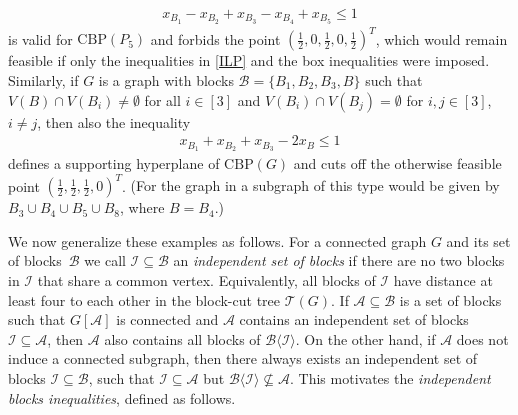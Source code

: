 \documentclass[12pt]{amsart}
\newcommand{\CBP}{\mathrm{CBP}}
\newcommand{\I}{\mathcal{I}}
\newcommand{\T}{\mathcal{T}}
\newcommand{\B}{\mathcal{B}}
\newcommand{\A}{\mathcal{A}}
\newcommand{\Xn}[1]{{\protect#1}}
\begin{document}
\begin{align*}
    x_{B_1}-x_{B_2}+x_{B_3}-x_{B_4}+x_{B_5} \le 1
\end{align*}
is valid for $\CBP(P_5)$ and forbids the point $(\frac{1}{2},0,\frac{1}{2},0,\frac{1}{2})^T$, which would remain feasible if only the inequalities in \eqref{ILP} and the box inequalities were imposed. Similarly, if $G$ is a graph with blocks $\B=\{B_1,B_2,B_3,B\}$ such that $V(B) \cap V(B_i) \neq \emptyset$ for all $i \in [3]$ and $V(B_i) \cap V(B_j)=\emptyset$ for $i,j \in [3]$, $i\neq j$, then also the inequality
\begin{align*}
    x_{B_1}+x_{B_2}+x_{B_3}-2x_{B} \le 1
\end{align*}
defines a supporting hyperplane of $\CBP(G)$ and cuts off the otherwise feasible point $(\frac{1}{2},\frac{1}{2},\frac{1}{2},0)^T$. \Xn{(For the graph in  a subgraph of this type would be given by $B_3 \cup B_4 \cup B_5 \cup B_8$, where $B=B_4$.)}

We now generalize these examples as follows. For a connected graph $G$ and its set of blocks~$\B$ we call $\I \subseteq \B$ an \textit{independent set of blocks} if there are no two blocks in $\I$ that share a common vertex. \Xn{Equivalently, all blocks of $\I$ have distance at least four to each other in the block-cut tree $\T(G)$.} If $\A \subseteq \B$ is a set of blocks such that $G[\A]$ is connected and $\A$ contains an independent set of blocks $\I \subseteq \A$, then $\A$ also contains all blocks of $\B\langle \I \rangle$. On the other hand, if $\A$ does not induce a connected subgraph, then there always exists an independent set of blocks $\I \subseteq \B$, such that $\I \subseteq \A$ but $\B\langle\I\rangle \nsubseteq \A$. This motivates the \textit{independent blocks inequalities}, defined as follows.
\end{document}
